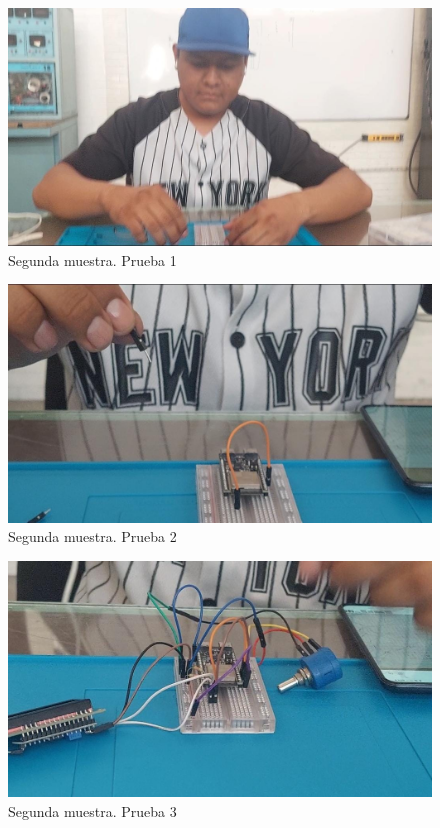\begin{figure}[H]
        \centering
        \includegraphics[trim = {30mm 30mm 30mm 30mm},clip,scale=0.2]{10/Img/muestra2Prueba1.jpg}
        \caption{Segunda muestra. Prueba 1}
        \label{Prueba 2.1}
    \end{figure}

\begin{figure}[H]
        \centering
        \includegraphics[trim = {30mm 30mm 30mm 30mm},clip,scale=0.2]{10/Img/muestra2Prueba2.jpg}
        \caption{Segunda muestra. Prueba 2}
        \label{Prueba 2.2}
    \end{figure}

\begin{figure}[H]
        \centering
        \includegraphics[trim = {30mm 30mm 30mm 30mm},clip,scale=0.2]{10/Img/muestra2Prueba3.jpg}
        \caption{Segunda muestra. Prueba 3}
        \label{Prueba 2.3}
    \end{figure}

